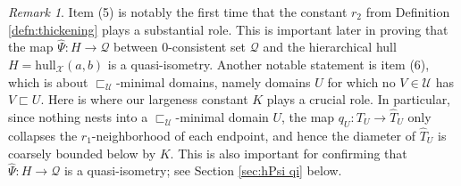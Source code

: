\documentclass{amsart}
\theoremstyle{definition}
\theoremstyle{remark}
\newtheorem{remark}[theorem]{Remark}
\theoremstyle{definition}
\newcommand{\calQ}{\mathcal{Q}}
\newcommand{\calU}{\mathcal{U}}
\newcommand{\calX}{\mathcal{X}}
\newcommand{\hT}{\widehat{T}}
\newcommand{\hPsi}{\widehat{\Psi}}
\newcommand{\hull}{\mathrm{hull}}
\newcommand{\nest}{\sqsubset}
\begin{document}
\begin{remark}
Item (5) is notably the first time that the constant $r_2$ from Definition \ref{defn:thickening} plays a substantial role.  This is important later in proving that the map $\hPsi:H \to \calQ$ between  $0$-consistent set $\calQ$ and the hierarchical hull $H = \hull_{\calX}(a,b)$ is a quasi-isometry.  Another notable statement is item (6), which is about $\nest_{\calU}$-minimal domains, namely domains $U$ for which no $V \in \calU$ has $V \nest U$.  Here is where our largeness constant $K$ plays a crucial role.  In particular, since nothing nests into a $\nest_{\calU}$-minimal domain $U$, the map $q_U: T_U \to \hT_U$ only collapses the $r_1$-neighborhood of each endpoint, and hence the diameter of $\hT_U$ is coarsely bounded below by $K$.  This is also important for confirming that $\hPsi:H \to \calQ$ is a quasi-isometry; see Section \ref{sec:hPsi qi} below.
\end{remark}
\end{document}
